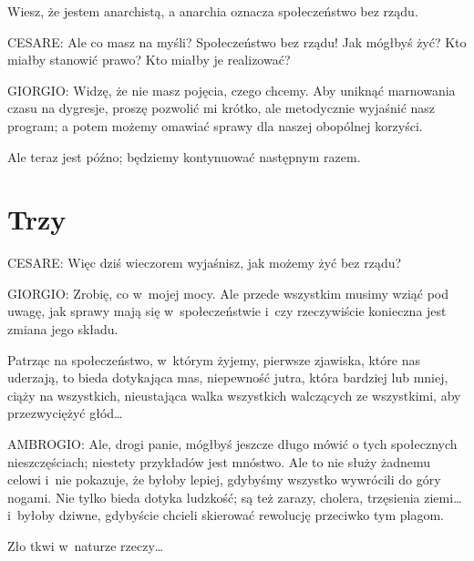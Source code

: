 \documentclass[oneside,polish,11pt,sfheadings]{mwbk}
\begin{document}
 
Wiesz, że jestem anarchistą, a anarchia oznacza społeczeństwo bez rządu. 




 
\noindent CESARE: Ale co masz na myśli? Społeczeństwo bez rządu! Jak mógłbyś żyć? Kto miałby stanowić prawo? Kto miałby je
realizować? 




 
\noindent GIORGIO: Widzę, że nie masz pojęcia, czego chcemy. Aby uniknąć marnowania czasu na dygresje, proszę pozwolić mi krótko,
ale metodycznie wyjaśnić nasz program; a potem możemy omawiać sprawy dla naszej obopólnej korzyści. 

 
Ale teraz jest późno; będziemy kontynuować następnym razem. 










\chapter*{Trzy}



 
\noindent CESARE: Więc dziś wieczorem wyjaśnisz, jak możemy żyć bez rządu? 




 
\noindent GIORGIO: Zrobię, co w~mojej mocy. Ale przede wszystkim musimy wziąć pod uwagę, jak sprawy mają się w~społeczeństwie i~czy rzeczywiście konieczna jest zmiana jego składu. 

 
Patrząc na społeczeństwo, w~którym żyjemy, pierwsze zjawiska, które nas uderzają, to bieda dotykająca mas, niepewność
jutra, która bardziej lub mniej, ciąży na wszystkich, nieustająca walka wszystkich walczących ze wszystkimi, aby
przezwyciężyć głód\ldots 




 
\noindent AMBROGIO: Ale, drogi panie, mógłbyś jeszcze długo mówić o tych społecznych nieszczęściach; niestety przykładów jest
mnóstwo. Ale to nie służy żadnemu celowi i~nie pokazuje, że byłoby lepiej, gdybyśmy wszystko wywrócili do góry nogami.
Nie tylko bieda dotyka ludzkość; są też zarazy, cholera, trzęsienia ziemi\ldots i~byłoby dziwne, gdybyście chcieli
skierować rewolucję przeciwko tym plagom. 

 
Zło tkwi w~naturze rzeczy\ldots 
\end{document}
